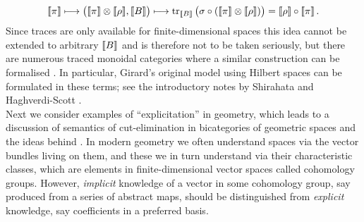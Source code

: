 \documentclass[english,letter paper,12pt,reqno]{article}
\theoremstyle{example}
\numberwithin{equation}{section}
\begin{document}
\[
\llbracket \pi \rrbracket \longmapsto \big( \llbracket \pi \rrbracket \otimes \llbracket \rho \rrbracket, \llbracket B \rrbracket \big) \longmapsto \operatorname{tr}_{\llbracket B \rrbracket}\big( \sigma \circ  (\llbracket \pi \rrbracket \otimes \llbracket \rho \rrbracket)\big) = \llbracket \rho \rrbracket \circ \llbracket \pi \rrbracket\,.
\]
Since traces are only available for finite-dimensional spaces this idea cannot be extended to arbitrary $\llbracket B \rrbracket$ and is therefore not to be taken seriously, but there are numerous traced monoidal categories where a similar construction can be formalised \cite{abramsky3,abramsky4,abramsky2}. In particular, Girard's original model using Hilbert spaces can be formulated in these terms; see the introductory notes by Shirahata \cite{shirahata} and Haghverdi-Scott \cite{haghverdi}.
\\

Next we consider examples of ``explicitation'' in geometry, which leads to a discussion of semantics of cut-elimination in bicategories of geometric spaces and the ideas behind \cite{murfet}. In modern geometry we often understand spaces via the vector bundles living on them, and these we in turn understand via their characteristic classes, which are elements in finite-dimensional vector spaces called cohomology groups. However, \emph{implicit} knowledge of a vector in some cohomology group, say produced from a series of abstract maps, should be distinguished from \emph{explicit} knowledge, say coefficients in a preferred basis.
\end{document}
